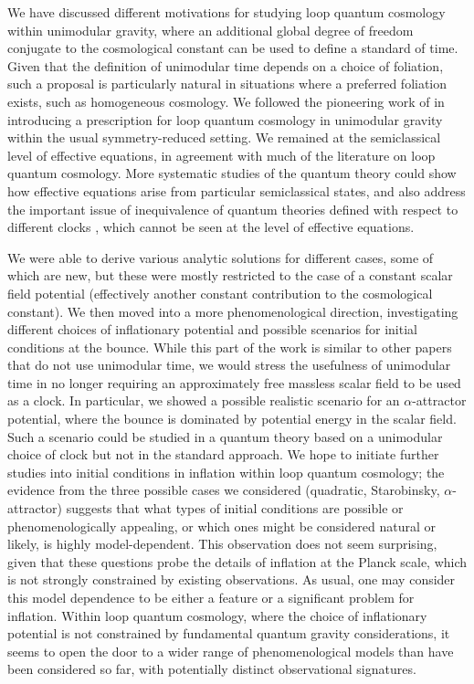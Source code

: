 \documentclass[aps,prd,11pt,showkeys,nofootinbib]{revtex4-2}
\begin{document}
We have discussed different motivations for studying loop quantum cosmology within unimodular gravity, where an additional global degree of freedom conjugate to the cosmological constant can be used to define a standard of time. Given that the definition of unimodular time depends on a choice of foliation, such a proposal is particularly natural in situations where a preferred foliation exists, such as homogeneous cosmology. We followed the pioneering work of \cite{Chiou:2010ne} in introducing a prescription for loop quantum cosmology in unimodular gravity within the usual symmetry-reduced setting. We remained at the semiclassical level of effective equations, in agreement with much of the literature on loop quantum cosmology. More systematic studies of the quantum theory could show how effective equations arise from particular semiclassical states, and also address the important issue of inequivalence of quantum theories defined with respect to different clocks \cite{Gielen:2020abd}, which cannot be seen at the level of effective equations.

We were able to derive various analytic solutions for different cases, some of which are new, but these were mostly restricted to the case of a constant scalar field potential (effectively another constant contribution to the cosmological constant). We then moved into a more phenomenological direction, investigating different choices of inflationary potential and possible scenarios for initial conditions at the bounce. While this part of the work is similar to other papers that do not use unimodular time, we would stress the usefulness of unimodular time in no longer requiring an approximately free massless scalar field to be used as a clock. In particular, we showed a possible realistic scenario for an $\alpha$-attractor potential, where the bounce is dominated by potential energy in the scalar field. Such a scenario could be studied in a quantum theory based on a unimodular choice of clock but not in the standard approach. We hope to initiate further studies into initial conditions in inflation within loop quantum cosmology; the evidence from the three possible cases we considered (quadratic, Starobinsky, $\alpha$-attractor) suggests that what types of initial conditions are possible or phenomenologically appealing, or which ones might be considered natural or likely, is highly model-dependent. This observation does not seem surprising, given that these questions probe the details of inflation at the Planck scale, which is not strongly constrained by existing observations. As usual, one may consider this model dependence to be either a feature or a significant problem for inflation. Within loop quantum cosmology, where the choice of inflationary potential is not constrained by fundamental quantum gravity considerations, it seems to open the door to a wider range of phenomenological models than have been considered so far, with potentially distinct observational signatures.
\end{document}
